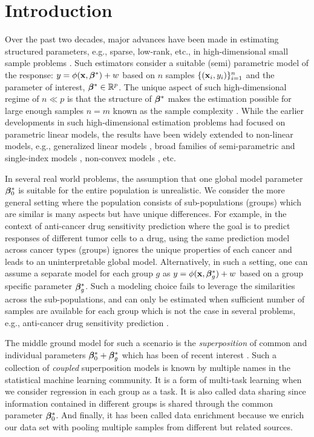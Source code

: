 \section{Introduction}
Over the past two decades, major advances have been made in estimating structured parameters, e.g., sparse, low-rank, etc., in high-dimensional small sample problems \cite{candes2010power, donoho2006compressed, friedman2008sparse}. Such estimators consider a suitable (semi) parametric model of the response: $y = \phi(\mathbf{x},\boldsymbol{\beta}^*) + w$ based on $n$ samples $\{(\mathbf{x}_i,y_i)\}_{i=1}^n$ and the parameter of interest, $\boldsymbol{\beta}^* \in \mathbb R^p$. The unique aspect of such high-dimensional regime of $n \ll p$ is that the structure of $\boldsymbol{\beta}^*$ makes
the estimation possible for large enough samples $n = m$ known as the sample complexity \cite{candes2009exact, candes2006robust, tibshirani1996regression}. While the earlier developments in such high-dimensional estimation problems had focused on parametric linear models, the results have been widely extended to non-linear models, e.g., generalized linear models \cite{bach2012optimization, negahban2009unified}, broad families of semi-parametric and single-index models \cite{boufounos20081, plan2017high}, non-convex models \cite{blumensath2009iterative,jain2013low}, etc.

In several real world problems, the assumption that one global model parameter $\boldsymbol{\beta}_0^*$ is suitable for the entire population is unrealistic.
We consider the more general setting where the population consists of sub-populations (groups) which are similar is many aspects but have unique differences. For example, in the context of anti-cancer drug sensitivity prediction where the goal is to predict responses of different tumor cells to a drug, using the same prediction model across cancer types (groups) ignores the unique properties of each cancer and leads to an uninterpretable global model. Alternatively, in such a setting, one can assume a separate model for each group $g$ as $y = \phi(\mathbf{x}, \boldsymbol{\beta}_g^*) + w$ based on a group specific parameter $\boldsymbol{\beta}^*_g$. Such a modeling choice fails to leverage the similarities across the sub-populations, and can only be estimated when sufficient number of samples are available for each group which is not the case in several problems, e.g., anti-cancer drug sensitivity prediction \cite{barretina2012cancer, iorio2016landscape1}.

The middle ground model for such a scenario is the \emph{superposition} of common and individual parameters $\boldsymbol{\beta}_0^* + \boldsymbol{\beta}_g^*$ which has been of recent interest \cite{guba16, mctr13, Yang2013-pf}. Such a collection of \emph{coupled} superposition models is known by multiple names in the statistical machine learning community. It is a form of multi-task learning \cite{jrsr10, Zhang2017-rm} when we consider regression in each group as a task. It is also called data sharing \cite{grti16} since information contained in different groups is shared through the common parameter $\boldsymbol{\beta}_0^*$. And finally, it has been called data enrichment \cite{asiaee2018high, asiaeedata, Chen2015-fj} because we enrich our data set with pooling multiple samples from different but related sources. 

